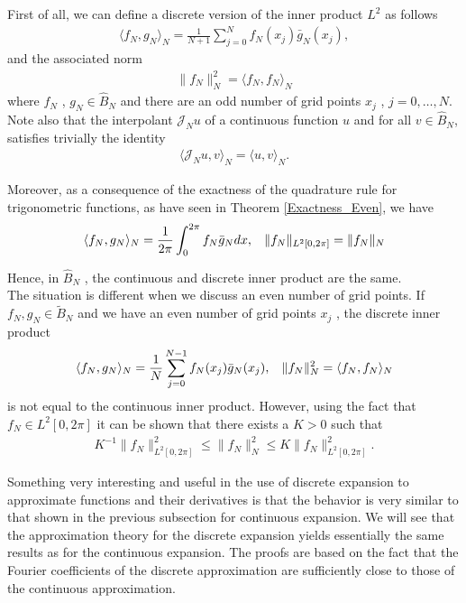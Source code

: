     \noindent First of all, we can define a discrete version of the inner product $L^2$ as follows
    \begin{align*}
    	\langle f_N, g_N \rangle_N = \displaystyle \frac{1}{N + 1} \sum_{j = 0}^{N} f_N (x_j) \bar{g}_N (x_j),
    \end{align*}
	and the associated norm
	\begin{align*}
		\| f_N \|_N^2 = \langle f_N, f_N \rangle_N
	\end{align*}
	where $f_N$ , $g_N \in \hat{B}_N$ and there are an odd number of grid points $x_j$ , $j = 0, \dots , N$. Note also that the interpolant $\mathcal{J}_N u$ of a continuous function $u$ and for all $v \in \hat{B}_N$, satisfies trivially the identity
	\begin{align*}
		\langle \mathcal{J}_N u, v \rangle_N = \langle u, v \rangle_N.
	\end{align*} 
	
	Moreover, as a consequence of the exactness of the quadrature rule for trigonometric functions, as have seen in Theorem \ref{Exactness_Even}, we have
	\begin{align*}
		\langle f_N, g_N \rangle_N = \displaystyle \frac{1}{2 \pi} \int_{0}^{2 \pi} f_N \bar{g}_N dx, \hspace{3mm} \|f_N\|_{L^2 [0, 2 \pi]} = \|f_N\|_N
	\end{align*}

	Hence, in $\hat{B}_N$ , the continuous and discrete inner product are the same.\\
	
	The situation is different when we discuss an even number of grid points. If $f_N , g_N \in \tilde{B}_N$ and we have an even number of grid points $x_j$ , the discrete inner product
	\begin{align*}
		\langle f_N, g_N \rangle_N = \displaystyle \frac{1}{N} \sum_{j = 0}^{N - 1} f_N (x_j) \bar{g}_N (x_j), \hspace{3mm} \|f_N\|_N^2 = \langle f_N, f_N \rangle_N
	\end{align*}
	is not equal to the continuous inner product. However, using the fact that $f_N \in L^2 [0, 2 \pi]$ it can be shown that there exists a $K > 0$ such that
	\begin{align}
	\label{equivalent_discrete_continous}
		K^{-1} \|f_N\|^2_{L^2 [0, 2 \pi]} \leq \|f_N\|^2_N \leq K \|f_N\|^2_{L^2 [0, 2 \pi]}.
	\end{align}
    
    Something very interesting and useful in the use of discrete expansion to approximate functions and their derivatives is that the behavior is very similar to that shown in the previous subsection for continuous expansion. We will see that the approximation theory for the discrete expansion yields essentially the same results as for the continuous expansion. The proofs are based on the fact that the Fourier coefficients of the discrete approximation are sufficiently close to those of the continuous approximation. \\
    
